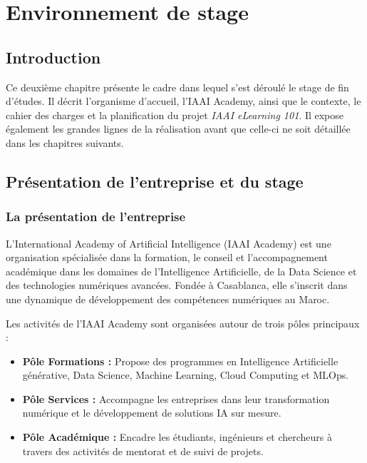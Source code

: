 \documentclass[12pt, a4paper]{report}
\begin{document}
\chapter{Environnement de stage}

\section{Introduction}
Ce deuxième chapitre présente le cadre dans lequel s'est déroulé le stage de fin
d'études. Il décrit l'organisme d'accueil, l'IAAI Academy, ainsi que le contexte,
le cahier des charges et la planification du projet \textit{IAAI eLearning 101}.
Il expose également les grandes lignes de la réalisation avant que celle-ci ne
soit détaillée dans les chapitres suivants.

\section{Présentation de l'entreprise et du stage}

\subsection{La présentation de l'entreprise}
L'International Academy of Artificial Intelligence (IAAI Academy) est une
organisation spécialisée dans la formation, le conseil et l'accompagnement
académique dans les domaines de l'Intelligence Artificielle, de la Data Science
et des technologies numériques avancées. Fondée à Casablanca, elle s'inscrit dans
une dynamique de développement des compétences numériques au Maroc.


Les activités de l'IAAI Academy sont organisées autour de trois pôles principaux :
\begin{itemize}
    \item \textbf{Pôle Formations :} Propose des programmes en Intelligence
    Artificielle générative, Data Science, Machine Learning, Cloud Computing et
    MLOps.
    \item \textbf{Pôle Services :} Accompagne les entreprises dans leur
    transformation numérique et le développement de solutions IA sur mesure.
    \item \textbf{Pôle Académique :} Encadre les étudiants, ingénieurs et
    chercheurs à travers des activités de mentorat et de suivi de projets.
\end{itemize}
\end{document}
